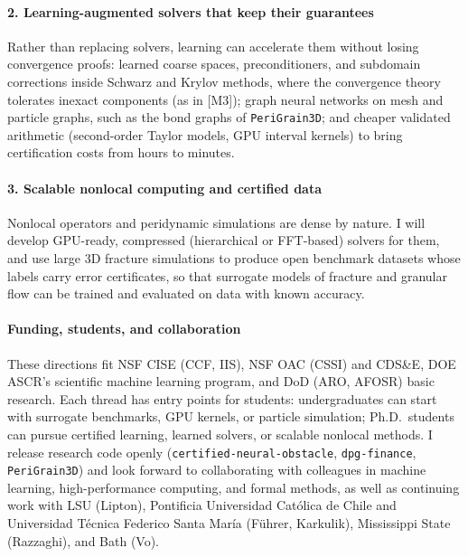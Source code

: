 \documentclass[11pt]{article}
\newcommand{\rc}[1]{\textcolor{accent}{[#1]}}
\begin{document}
\paragraph{2. Learning-augmented solvers that keep their guarantees}
Rather than replacing solvers, learning can accelerate them without losing
convergence proofs: learned coarse spaces, preconditioners, and subdomain
corrections inside Schwarz and Krylov methods, where the convergence theory
tolerates inexact components (as in \rc{M3}); graph neural networks on
mesh and particle graphs, such as the bond graphs of \texttt{PeriGrain3D}; and
cheaper validated arithmetic (second-order Taylor models, GPU interval
kernels) to bring certification costs from hours to minutes.

\paragraph{3. Scalable nonlocal computing and certified data}
Nonlocal operators and peridynamic simulations are dense by nature. I will
develop GPU-ready, compressed (hierarchical or FFT-based) solvers for them,
and use large 3D fracture simulations to produce open benchmark datasets whose
labels carry error certificates, so that surrogate models of fracture and
granular flow can be trained and evaluated on data with known accuracy.

\paragraph{Funding, students, and collaboration}
These directions fit NSF CISE (CCF, IIS), NSF OAC (CSSI) and CDS\&E, DOE ASCR's
scientific machine learning program, and DoD (ARO, AFOSR) basic research.
Each thread has entry points for students: undergraduates can start with
surrogate benchmarks, GPU kernels, or particle simulation; Ph.D.\ students can
pursue certified learning, learned solvers, or scalable nonlocal methods. I
release research code openly (\texttt{certified-neural-obstacle},
\texttt{dpg-finance}, \texttt{PeriGrain3D}) and look forward to collaborating
with colleagues in machine learning, high-performance computing, and
formal methods, as well as continuing work with LSU (Lipton), Pontificia
Universidad Cat\'olica de Chile and Universidad T\'ecnica Federico Santa
Mar\'ia (F\"uhrer, Karkulik), Mississippi State (Razzaghi), and Bath (Vo).

\vspace{-4pt}
\end{document}
